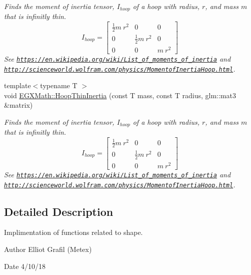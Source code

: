 \begin{DoxyCompactItemize}
\begin{DoxyCompactList}\small\item\em Finds the moment of inertia tensor, $I_{hoop}$ of a hoop with radius, $r$, and mass $m$ that is infinitly thin. \[ I_{hoop}=\begin{bmatrix} \frac{1}{2}m\ r^2 & 0 & 0\\ 0 & \frac{1}{2}m\ r^2 & 0\\ 0 & 0 & m\ r^2 \end{bmatrix} \] See \href{https://en.wikipedia.org/wiki/List_of_moments_of_inertia}{\tt https\+://en.\+wikipedia.\+org/wiki/\+List\+\_\+of\+\_\+moments\+\_\+of\+\_\+inertia} and \href{http://scienceworld.wolfram.com/physics/MomentofInertiaHoop.html}{\tt http\+://scienceworld.\+wolfram.\+com/physics/\+Momentof\+Inertia\+Hoop.\+html}. \end{DoxyCompactList}\item 
{\footnotesize template$<$typename T $>$ }\\void \mbox{\hyperlink{group___e_g_x_math-_geometry-3_d-_hoop_ga810ed1548ab8825b8830b97cfcbcfe11}{E\+G\+X\+Math\+::\+Hoop\+Thin\+Inertia}} (const T mass, const T radius, glm\+::mat3 \&matrix)
\begin{DoxyCompactList}\small\item\em Finds the moment of inertia tensor, $I_{hoop}$ of a hoop with radius, $r$, and mass $m$ that is infinitly thin. \[ I_{hoop}=\begin{bmatrix} \frac{1}{2}m\ r^2 & 0 & 0\\ 0 & \frac{1}{2}m\ r^2 & 0\\ 0 & 0 & m\ r^2 \end{bmatrix} \] See \href{https://en.wikipedia.org/wiki/List_of_moments_of_inertia}{\tt https\+://en.\+wikipedia.\+org/wiki/\+List\+\_\+of\+\_\+moments\+\_\+of\+\_\+inertia} and \href{http://scienceworld.wolfram.com/physics/MomentofInertiaHoop.html}{\tt http\+://scienceworld.\+wolfram.\+com/physics/\+Momentof\+Inertia\+Hoop.\+html}. \end{DoxyCompactList}\end{DoxyCompactItemize}


\subsection{Detailed Description}
Implimentation of functions related to shape. 

\begin{DoxyAuthor}{Author}
Elliot Grafil (Metex) 
\end{DoxyAuthor}
\begin{DoxyDate}{Date}
4/10/18 
\end{DoxyDate}
